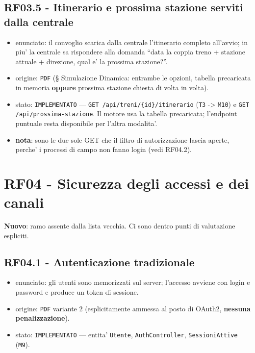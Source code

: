 \documentclass[11pt]{article}
\begin{document}
\subsection{RF03.5 - Itinerario e prossima stazione serviti dalla centrale}
\label{sec:org273bb44}
\begin{itemize}
\item enunciato: il convoglio scarica dalla centrale l'itinerario completo all'avvio; in piu' la
centrale sa rispondere alla domanda ``data la coppia treno + stazione attuale + direzione, qual e'
la prossima stazione?''.
\item origine: \texttt{PDF} (§ Simulazione Dinamica: entrambe le opzioni, tabella precaricata in memoria
\textbf{oppure} prossima stazione chiesta di volta in volta).
\item stato: \texttt{IMPLEMENTATO} — \texttt{GET /api/treni/\{id\}/itinerario} (\texttt{T3} -> \texttt{M10}) e
\texttt{GET /api/prossima-stazione}. Il motore usa la tabella precaricata; l'endpoint puntuale resta
disponibile per l'altra modalita'.
\item \textbf{nota}: sono le due sole GET che il filtro di autorizzazione lascia aperte, perche' i processi di
campo non fanno login (vedi RF04.2).
\end{itemize}
\section{RF04 - Sicurezza degli accessi e dei canali}
\label{sec:org03fcd72}

\textbf{Nuovo}: ramo assente dalla lista vecchia. Ci sono dentro punti di valutazione espliciti.
\subsection{RF04.1 - Autenticazione tradizionale}
\label{sec:org7030046}
\begin{itemize}
\item enunciato: gli utenti sono memorizzati sul server; l'accesso avviene con login e password e
produce un token di sessione.
\item origine: \texttt{PDF} variante 2 (esplicitamente ammessa al posto di OAuth2, \textbf{nessuna penalizzazione}).
\item stato: \texttt{IMPLEMENTATO} — entita' \texttt{Utente}, \texttt{AuthController}, \texttt{SessioniAttive} (\texttt{M9}).
\end{itemize}
\end{document}

